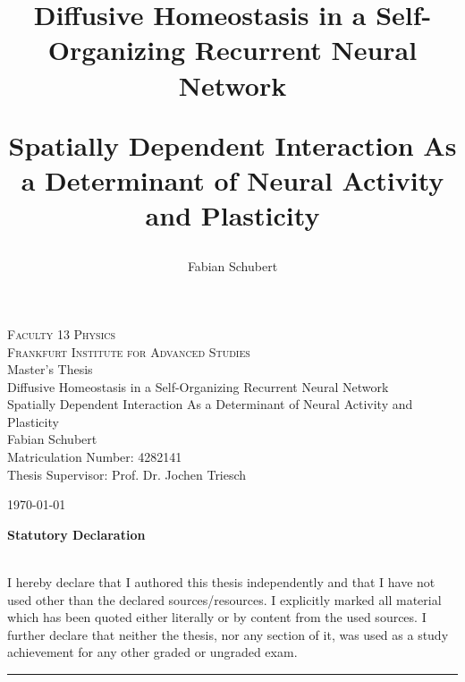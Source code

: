 \documentclass[10pt,a4paper]{article}
\author{Fabian Schubert}
\title{Diffusive Homeostasis in a Self-Organizing Recurrent Neural Network \\
\begin{large}
Spatially Dependent Interaction As a Determinant of Neural Activity and Plasticity
\end{large}
}
\begin{document}
\tabulinesep=1.2mm

\begin{titlepage}
\clearpage
\thispagestyle{empty}
\begin{center}
\LARGE{{\scshape Faculty 13 Physics}\\
  {\scshape Frankfurt Institute for Advanced Studies}\\
  \vspace{1cm}
  Master's Thesis\\}
  \vspace{1cm}
  \huge{Diffusive Homeostasis in a Self-Organizing Recurrent Neural Network}\\
  \vspace{0.5cm}
  \LARGE{Spatially Dependent Interaction As a Determinant of Neural Activity and Plasticity}\\
  \vspace{2cm}
  \LARGE{Fabian Schubert\\
  Matriculation Number: 4282141}\\
  \vspace{2cm}
  Thesis Supervisor: Prof. Dr. Jochen Triesch\\
  \end{center}

\vfill

\begin{center}
{\large \today}
\end{center}
\end{titlepage}

\clearpage

\mbox{}
\thispagestyle{empty}

\newpage


\begin{LARGE}
\noindent\textbf{Statutory Declaration}
\end{LARGE}
\vspace{.5cm}\\
I hereby declare that I authored this thesis independently and that I have
not used other than the declared sources/resources. I explicitly marked all material which has been quoted either literally or by content from the used sources. I further declare that neither the thesis, nor any section of it, was used as a study achievement for any other graded or ungraded exam.  
\vspace{2cm}\\
\rule{\textwidth}{0.4pt}
\end{document}
